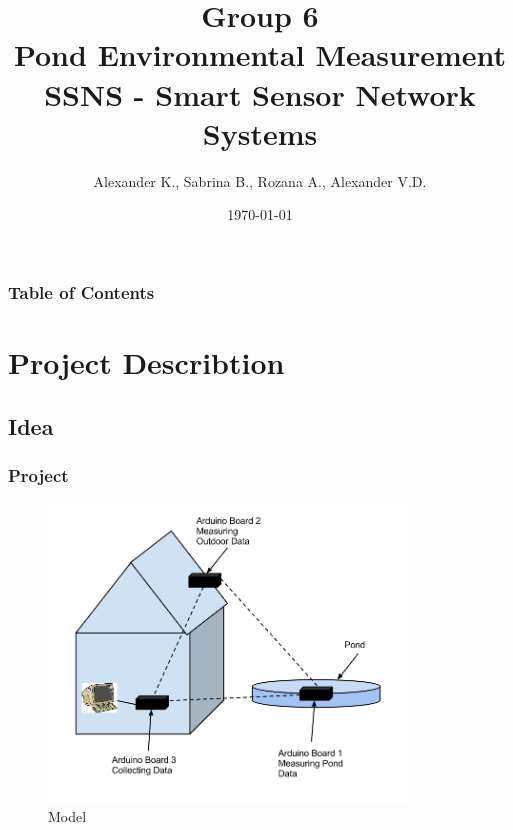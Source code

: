 \documentclass{beamer}
\title{Group 6\\
	Pond Environmental Measurement\\
	SSNS - Smart Sensor Network Systems}
\author{Alexander K.,
	Sabrina B.,
	Rozana A.,
	Alexander V.D.}
\institute[FHF] {Fachhochschule Frankfurt am Main - University of Applied Sciences}
\date 
{\today}
\begin{document}
\maketitle
\begin{frame}
\frametitle{Table of Contents}
\tableofcontents
\end{frame}

\section{Project Describtion} 
\subsection{Idea}
\frame
{
	\frametitle{Project}
	\begin{figure}[h!]
  		\centering
    	\includegraphics[width=0.85\textwidth]{../Images/ssns_project.png}
		\caption{Model}
	\end{figure}
}

%
\end{document}

